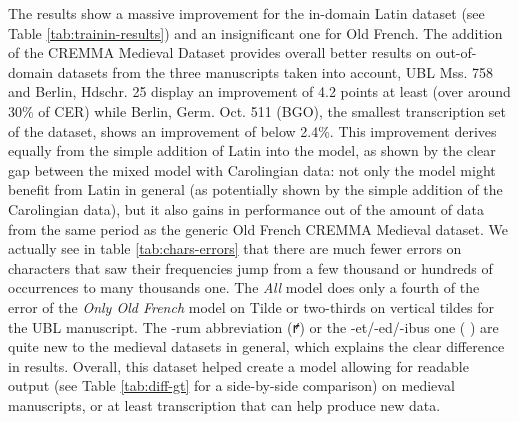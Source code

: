 \documentclass{article}
\newcommand{\juni}[1]{\textsf{\junicodeFont #1}}%
\begin{document}
The results show a massive improvement for the in-domain Latin dataset (see Table \ref{tab:trainin-results}) and an insignificant one for Old French. The addition of the CREMMA Medieval Dataset provides overall better results on out-of-domain datasets from the three manuscripts taken into account, UBL Mss. 758 and Berlin, Hdschr. 25 display an improvement of 4.2 points at least (over around 30\% of CER) while Berlin, Germ. Oct. 511 (BGO), the smallest transcription set of the dataset, shows an improvement of below 2.4\%. This improvement derives equally from the simple addition of Latin into the model, as shown by the clear gap between the mixed model with Carolingian data: not only the model might benefit from Latin in general (as potentially shown by the simple addition of the Carolingian data), but it also gains in performance out of the amount of data from the same period as the generic Old French CREMMA Medieval dataset. We actually see in table \ref{tab:chars-errors} that there are much fewer errors on characters that saw their frequencies jump from a few thousand or hundreds of occurrences to many thousands one. The \textit{All} model does only a fourth of the error of the \textit{Only Old French} model on Tilde or two-thirds on vertical tildes for the UBL manuscript. The -rum abbreviation (\juni{ꝵ}) or the -et/-ed/-ibus one ( \juni{)} are quite new to the medieval datasets in general, which explains the clear difference in results. Overall, this dataset helped create a model allowing for readable output (see Table \ref{tab:diff-gt} for a side-by-side comparison) on medieval manuscripts, or at least transcription that can help produce new data.



\begin{table}[]
    \centering
    \resizebox{\linewidth}{!}{%
    \begin{tabular}{llllll}
    \hline
    Model                       & Medieval Old French (In Domain) & Medieval Latin (In Domain) & UBL   & BGO   & BH25   \\ \hline
    All                         & 94.30        & 90.15                      & 71.69 & 79.12 & 85.10 \\
    No CREMMA Medii Aevi          & 94.04        & 80.68                      & 67.68 & 78.02 & 81.89 \\
    Only Old French                    & 94.01        & 78.10                      & 67.49 & 76.81 & 80.74 \\ \hline
    \end{tabular}
    }
    \caption{General accuracy results of the models. Model \textit{All} contains all data presented in Table \ref{tab:datasets}, model \textit{No CREMMA Medii Aevi} contains everything but the present dataset, model \textit{Only Old French} contains all datasets but Latin one (Eutyches, Caroline, CREMMA Medii Aevi). Two types of test sets are present: the \enquote{In Domain} dataset are pages from the same manuscripts as the models, all others (UBL 758, BGO 511, and B.H. 25) are manuscripts from the \textit{Faithful Transcriptions Data Set} aligned in CREMMA Medii Aevi but not used for training purposes.}
    \label{tab:trainin-results}
\end{table}
\end{document}
